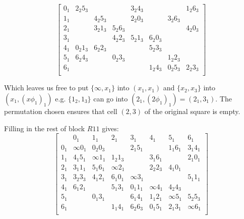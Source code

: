 \begin{example}
\begin{equation*}
\begin{bmatrix}
   0_{1} & 2_{2}5_{3} &            &             & 3_{2}4_{3} &             &            & 1_{2}6_{3} \\
   1_{1} &            & 4_{2}5_{3} &             & 2_{2}0_{3} &             & 3_{2}6_{3} &            \\
   2_{1} &            & 3_{2}1_{3} &  5_{2}6_{3} &            &             &            & 4_{2}0_{3} \\
   3_{1} &            &            &  4_{2}2_{3} & 5_{2}1_{3} & 6_{2}0_{3}  &            &            \\
   4_{1} & 0_{2}1_{3} & 6_{2}2_{3} &             &            & 5_{2}3_{3}  &            &            \\
   5_{1} & 6_{2}4_{3} &            &  0_{2}3_{3} &            &             & 1_{2}2_{3} &            \\
   6_{1} &            &            &             &            & 1_{2}4_{3}  & 0_{2}5_{3} & 2_{2}3_{3} \\
  \end{bmatrix}
\end{equation*}

Which leaves us free to put $\{\infty, x_1\}$ into $(x_1, x_1)$ and $\{x_2, x_3\}$ into $(x_1, (x\phi _1)_1)$ e.g. $\{1_2, 1_3\}$ can go into $(2_1, (2\phi _1)_1) = (2_1,3_1)$.
The permutation chosen ensures that cell $(2, 3)$ of the original square is empty.

Filling in the rest of block $R11$ gives:
\begin{equation*}
  \begin{bmatrix}
         &      0_{1} &   1_{1}    &    2_{1}    &    3_{1}   &    4_{1}    &    5_{1}   &    6_{1}   \\
   0_{1} & \infty     0_{1} & 0_{2}0_{3} &             & 2_{1}5_{1} &             & 1_{1}6_{1} & 3_{1}4_{1} \\
   1_{1} & 4_{1}5_{1} & \infty     1_{1} &  1_{2}1_{3} &            & 3_{1}6_{1}  &            & 2_{1}0_{1} \\
   2_{1} & 3_{1}1_{1} & 5_{1}6_{1} &  \infty     2_{1} &            & 2_{2}2_{3}  & 4_{1}0_{1} &            \\
   3_{1} & 3_{2}3_{3} & 4_{1}2_{1} &  6_{1}0_{1} & \infty     3_{1} &             &            & 5_{1}1_{1} \\ 
   4_{1} & 6_{1}2_{1} &            &  5_{1}3_{1} & 0_{1}1_{1} & \infty     4_{1}  & 4_{2}4_{3} &            \\
   5_{1} &            & 0_{1}3_{1} &             & 6_{1}4_{1} & 1_{1}2_{1}  & \infty     5_{1} & 5_{2}5_{3} \\
   6_{1} &            &            &  1_{1}4_{1} & 6_{2}6_{3} & 0_{1}5_{1}  & 2_{1}3_{1} & \infty     6_{1} \\
  \end{bmatrix}
\end{equation*}


\end{example}
